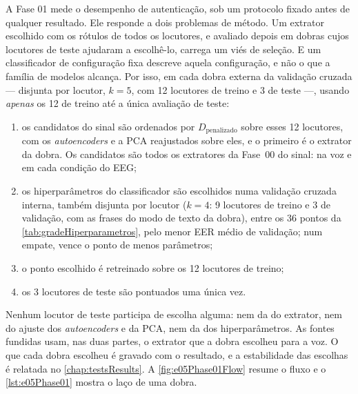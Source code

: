 				\par A Fase 01 mede o desempenho de autenticação, sob um protocolo fixado antes de qualquer resultado. Ele responde a dois problemas de método. Um extrator escolhido com os rótulos de todos os locutores, e avaliado depois em dobras cujos locutores de teste ajudaram a escolhê-lo, carrega um viés de seleção. E um classificador de configuração fixa descreve aquela configuração, e não o que a família de modelos alcança. Por isso, em cada dobra externa da validação cruzada --- disjunta por locutor, $k = 5$, com 12 locutores de treino e 3 de teste ---, usando \emph{apenas} os 12 de treino até a única avaliação de teste:
				\begin{enumerate}
					\item os candidatos do sinal são ordenados por $D_{\text{penalizado}}$ sobre esses 12 locutores, com os \textit{autoencoders} e a \ac{PCA} reajustados sobre eles, e o primeiro é o extrator da dobra. Os candidatos são todos os extratores da Fase~00 do sinal:  na voz e  em cada condição do \ac{EEG};
					\item os hiperparâmetros do classificador são escolhidos numa validação cruzada interna, também disjunta por locutor ($k = 4$: 9 locutores de treino e 3 de validação, com as frases do modo de texto da dobra), entre os 36 pontos da \autoref{tab:gradeHiperparametros}, pelo menor \ac{EER} médio de validação; num empate, vence o ponto de menos parâmetros;
					\item o ponto escolhido é retreinado sobre os 12 locutores de treino;
					\item os 3 locutores de teste são pontuados uma única vez.
				\end{enumerate}
				Nenhum locutor de teste participa de escolha alguma: nem da do extrator, nem do ajuste dos \textit{autoencoders} e da \ac{PCA}, nem da dos hiperparâmetros. As fontes fundidas usam, nas duas partes, o extrator que a dobra escolheu para a voz. O que cada dobra escolheu é gravado com o resultado, e a estabilidade das escolhas é relatada no \autoref{chap:testsResults}. A \autoref{fig:e05Phase01Flow} resume o fluxo e o \autoref{lst:e05Phase01} mostra o laço de uma dobra.

